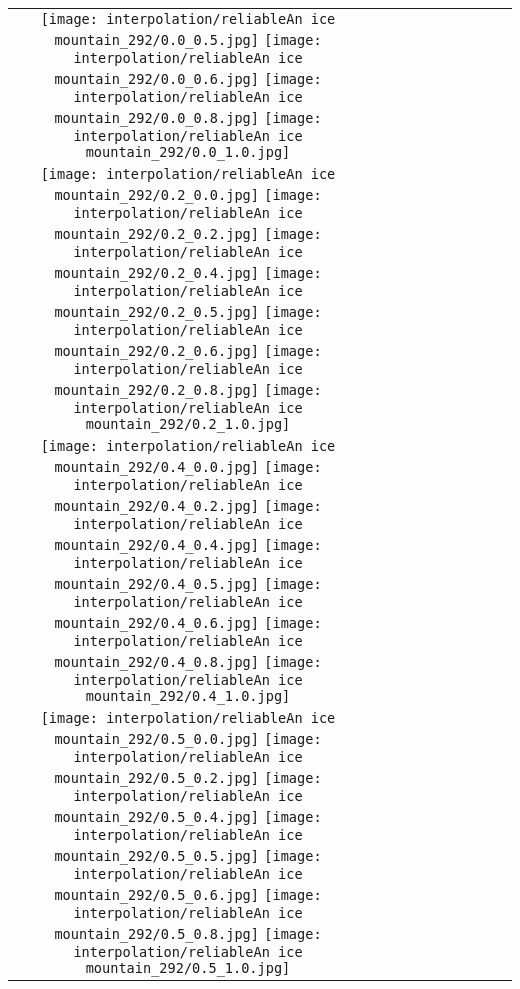 \documentclass[10pt,twocolumn,letterpaper]{article}
\begin{document}
\begin{figure*}[tb!]
{\begin{tabular}{c c c c c c c c c c}
  \texttt{[image: interpolation/reliableAn ice mountain\_292/0.0\_0.5.jpg]}
  \texttt{[image: interpolation/reliableAn ice mountain\_292/0.0\_0.6.jpg]}
  \texttt{[image: interpolation/reliableAn ice mountain\_292/0.0\_0.8.jpg]}
  \texttt{[image: interpolation/reliableAn ice mountain\_292/0.0\_1.0.jpg]}
 \tabularnewline
     \raisebox{0.1in}{\rotatebox{90}{\small \emph{$0.2$}
 }}
  \texttt{[image: interpolation/reliableAn ice mountain\_292/0.2\_0.0.jpg]}
  \texttt{[image: interpolation/reliableAn ice mountain\_292/0.2\_0.2.jpg]}
  \texttt{[image: interpolation/reliableAn ice mountain\_292/0.2\_0.4.jpg]}
  \texttt{[image: interpolation/reliableAn ice mountain\_292/0.2\_0.5.jpg]}
  \texttt{[image: interpolation/reliableAn ice mountain\_292/0.2\_0.6.jpg]}
  \texttt{[image: interpolation/reliableAn ice mountain\_292/0.2\_0.8.jpg]}
  \texttt{[image: interpolation/reliableAn ice mountain\_292/0.2\_1.0.jpg]}
\tabularnewline
    \raisebox{0.1in}{\rotatebox{90}{\small \emph{$0.4$}
 }}
  \texttt{[image: interpolation/reliableAn ice mountain\_292/0.4\_0.0.jpg]}
  \texttt{[image: interpolation/reliableAn ice mountain\_292/0.4\_0.2.jpg]}
  \texttt{[image: interpolation/reliableAn ice mountain\_292/0.4\_0.4.jpg]}
  \texttt{[image: interpolation/reliableAn ice mountain\_292/0.4\_0.5.jpg]}
  \texttt{[image: interpolation/reliableAn ice mountain\_292/0.4\_0.6.jpg]}
  \texttt{[image: interpolation/reliableAn ice mountain\_292/0.4\_0.8.jpg]}
  \texttt{[image: interpolation/reliableAn ice mountain\_292/0.4\_1.0.jpg]}
\tabularnewline
    \raisebox{0.1in}{\rotatebox{90}{\small \emph{$0.5$}
 }}
  \texttt{[image: interpolation/reliableAn ice mountain\_292/0.5\_0.0.jpg]}
  \texttt{[image: interpolation/reliableAn ice mountain\_292/0.5\_0.2.jpg]}
  \texttt{[image: interpolation/reliableAn ice mountain\_292/0.5\_0.4.jpg]}
  \texttt{[image: interpolation/reliableAn ice mountain\_292/0.5\_0.5.jpg]}
  \texttt{[image: interpolation/reliableAn ice mountain\_292/0.5\_0.6.jpg]}
  \texttt{[image: interpolation/reliableAn ice mountain\_292/0.5\_0.8.jpg]}
  \texttt{[image: interpolation/reliableAn ice mountain\_292/0.5\_1.0.jpg]}

\end{tabular}}
\end{figure*}
\end{document}

